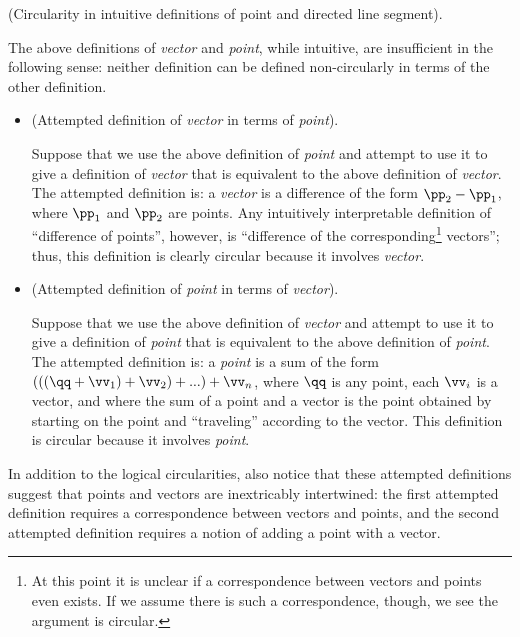 \begin{remark}
    (Circularity in intuitive definitions of point and directed line segment).
    
    The above definitions of \textit{vector} and \textit{point}, while intuitive, are insufficient in the following sense: neither definition can be defined non-circularly in terms of the other definition.
    
    \begin{itemize}
        \item (Attempted definition of \textit{vector} in terms of \textit{point}). 
        
        Suppose that we use the above definition of \textit{point} and attempt to use it to give a definition of \textit{vector} that is equivalent to the above definition of \textit{vector}. The attempted definition is: a \textit{vector} is a difference of the form $\pp_2 - \pp_1$, where $\pp_1$ and $\pp_2$ are points. Any intuitively interpretable definition of ``difference of points'', however, is ``difference of the corresponding\footnote{At this point it is unclear if a correspondence between vectors and points even exists. If we assume there is such a correspondence, though, we see the argument is circular.} vectors''; thus, this definition is clearly circular because it involves \textit{vector}.
        
        \item (Attempted definition of \textit{point} in terms of \textit{vector}). 
        
        Suppose that we use the above definition of \textit{vector} and attempt to use it to give a definition of \textit{point} that is equivalent to the above definition of \textit{point}. The attempted definition is: a \textit{point} is a sum of the form $(((\qq + \vv_1) + \vv_2) + ...) + \vv_n$, where $\qq$ is any point, each $\vv_i$ is a vector, and where the sum of a point and a vector is the point obtained by starting on the point and ``traveling'' according to the vector. This definition is circular because it involves \textit{point}.
    \end{itemize}
    
    In addition to the logical circularities, also notice that these attempted definitions suggest that points and vectors are inextricably intertwined: the first attempted definition requires a correspondence between vectors and points, and the second attempted definition requires a notion of adding a point with a vector.
\end{remark}

